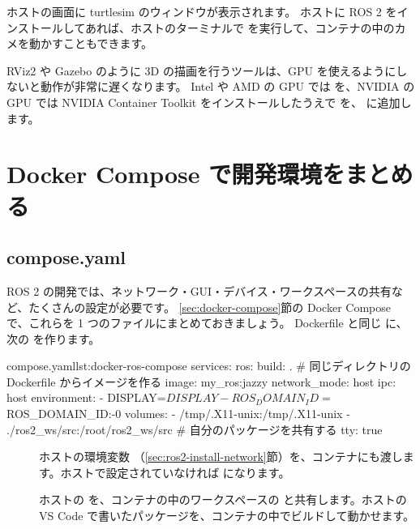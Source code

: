 ホストの画面に turtlesim のウィンドウが表示されます。
ホストに ROS 2 をインストールしてあれば、ホストのターミナルで  を実行して、コンテナの中のカメを動かすこともできます。

RViz2 や Gazebo のように 3D の描画を行うツールは、GPU を使えるようにしないと動作が非常に遅くなります。
Intel や AMD の GPU では  を、NVIDIA の GPU では NVIDIA Container Toolkit をインストールしたうえで  を、 に追加します。

\section{Docker Compose で開発環境をまとめる}
\label{sec:docker-ros-compose}

\subsection{compose.yaml}

ROS 2 の開発では、ネットワーク・GUI・デバイス・ワークスペースの共有など、たくさんの設定が必要です。
\ref{sec:docker-compose}節の Docker Compose で、これらを 1 つのファイルにまとめておきましょう。
Dockerfile と同じ  に、次の  を作ります。

\begin{codelisting}{compose.yaml}{lst:docker-ros-compose}
services:
  ros:
    build: .                     # 同じディレクトリの Dockerfile からイメージを作る
    image: my_ros:jazzy
    network_mode: host
    ipc: host
    environment:
      - DISPLAY=${DISPLAY}
      - ROS_DOMAIN_ID=${ROS_DOMAIN_ID:-0}
    volumes:
      - /tmp/.X11-unix:/tmp/.X11-unix
      - ./ros2_ws/src:/root/ros2_ws/src   # 自分のパッケージを共有する
    tty: true
\end{codelisting}

\begin{description}
  \item[] ホストの環境変数 （\ref{sec:ros2-install-network}節）を、コンテナにも渡します。ホストで設定されていなければ  になります。
  \item[] ホストの  を、コンテナの中のワークスペースの  と共有します。ホストの VS Code で書いたパッケージを、コンテナの中でビルドして動かせます。
\end{description}

